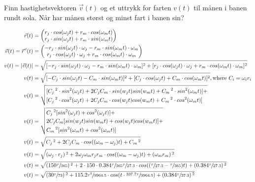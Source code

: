 \documentclass{../../myassignment}
\begin{document}
	\newpage

	\begin{problem}
		Finn hastighetsvektoren $\vec{v}(t)$ og et uttrykk for farten $v(t)$ til månen i banen rundt sola. Når har månen størst og minst fart i banen sin?
	\end{problem}
	\begin{answer}
		\begin{align}
			\vec{r}(t) &= \begin{pmatrix} r_j \cdot cos(\omega_j t) + r_m \cdot cos(\omega_m t) \\ r_j \cdot sin(\omega_j t) + r_m \cdot sin(\omega_m t) \end{pmatrix} \\
			\vec{v}(t) = \vec{r}\,'(t) &= \begin{pmatrix} - r_j \cdot sin(\omega_j t) \cdot \omega_j - r_m \cdot sin(\omega_m t) \cdot \omega_m \\ r_j \cdot cos(\omega_j t) \cdot \omega_j + r_m \cdot cos(\omega_m t) \cdot \omega_m \end{pmatrix} \\
			v(t) = |\vec{v}(t)| &= \sqrt{[- r_j \cdot sin(\omega_j t) \cdot \omega_j - r_m \cdot sin(\omega_m t) \cdot \omega_m]^2 + [r_j \cdot cos(\omega_j t) \cdot \omega_j + r_m \cdot cos(\omega_m t) \cdot \omega_m]^2 } \\
			v(t) &= \sqrt{[- C_j \cdot sin(\omega_j t) - C_m \cdot sin(\omega_m t)]^2 + [C_j \cdot cos(\omega_j t) + C_m \cdot cos(\omega_m t)]^2 }, \text{where } C_i = \omega_i r_i \\
			v(t) &= \sqrt{
				\begin{aligned}
					&[C_j\,^2 \cdot sin^2(\omega_j t) + 2C_jC_m\cdot sin(w_j t)sin(w_m t) + C_m\,^2 \cdot sin^2(\omega_m t)] + \\
					&[C_j\,^2 \cdot cos^2(\omega_j t) + 2C_jC_m\cdot cos(w_j t)cos(w_m t) + C_m\,^2 \cdot cos^2(\omega_m t)]
				\end{aligned}
				}\\
			v(t) &= \sqrt{
				\begin{aligned}
					& C_j\,^2 [sin^2(\omega_j t)+cos^2(\omega_j t)] + \\
					& 2C_jC_m [sin(w_j t)sin(w_m t) + cos(w_j t)cos(w_m t)] + \\
					& C_m\,^2 [sin^2(\omega_m t) + cos^2(\omega_m t)]
				\end{aligned}
				}\\
				v(t) &= \sqrt{ C_j\,^2 + 2C_jC_m \cdot cos((\omega_m - \omega_j)t) + C_m\,^2 }\\
				v(t) &= \sqrt{ (\omega_j\cdot r_j)\,^2 + 2\omega_j\omega_m r_j r_m \cdot cos((\omega_m - \omega	_j)t) + (\omega_m r_m)\,^2 }\\
				v(t) &= \sqrt{ (150\sfrac{\tau}{365})\,^2 + 2\cdot150\cdot0.384\sfrac{\tau}{365}\sfrac{\tau}{27.3} \cdot cos((\sfrac{\tau}{27.3} - \sfrac{\tau}{365})t) + ( 0.384\sfrac{\tau}{27.3})\,^2 }\\
				v(t) &= \sqrt{ (30\sfrac{\tau}{73})\,^2 + 115.2\sfrac{\tau^2}{9964.5} \cdot cos(t\cdot \sfrac{337.7\tau}{9964.5}) + ( 0.384\sfrac{\tau}{27.3})\,^2 }
		\end{align}
	\end{answer}
\end{document}
